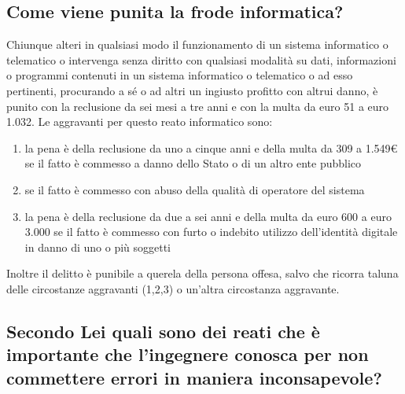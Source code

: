 \subsection{Come viene punita la frode informatica?}
Chiunque alteri in qualsiasi modo il funzionamento di un sistema informatico o
telematico o intervenga senza diritto con qualsiasi modalità su dati,
informazioni o programmi contenuti in un sistema informatico o telematico o ad
esso pertinenti, procurando a sé o ad altri un ingiusto profitto con altrui
danno, è punito con la reclusione da sei mesi a tre anni e con la multa da euro
51 a euro 1.032.
\newline
Le aggravanti per questo reato informatico sono:
\begin{enumerate}
    \item la pena è della reclusione da uno a cinque anni e della multa da 309
        a 1.549€ se il fatto è commesso a danno dello Stato o di un altro ente
        pubblico
    \item se il fatto è commesso con abuso della qualità di operatore del sistema
    \item la pena è della reclusione da due a sei anni e della multa da euro
        600 a euro 3.000 se il fatto è commesso con furto o indebito utilizzo
        dell'identità digitale in danno di uno o più soggetti
\end{enumerate}
Inoltre il delitto è punibile a querela della persona offesa, salvo che ricorra
taluna delle circostanze aggravanti (1,2,3) o un'altra circostanza aggravante.
\subsection{Secondo Lei quali sono dei reati che è importante che l'ingegnere
conosca per non commettere errori in maniera inconsapevole?}

